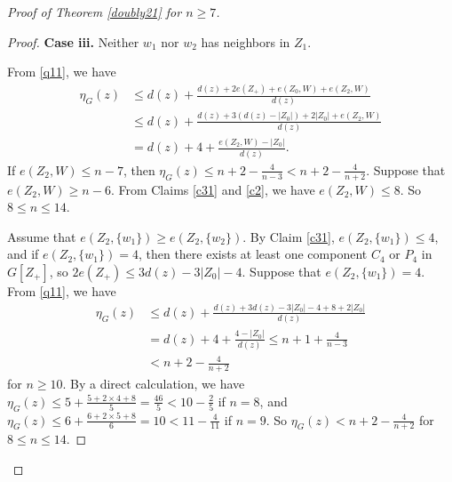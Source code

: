 \documentclass[12pt]{article}
\begin{document}
\begin{proof}[Proof of Theorem \ref{doubly21} for $n\ge 7$]
\begin{proof}
\noindent
{\bf Case iii.} Neither $w_1$ nor $w_2$  has neighbors in  $Z_1$.


From \eqref{q11}, we have
\begin{align*}
\eta_G(z)&\le  d(z)+\frac{d(z)+2e(Z_+)+e(Z_0,W)+e(Z_2,W)}{d(z)}\\
&\le d(z)+\frac{d(z)+3(d(z)-|Z_0|)+2|Z_0|+e(Z_2,W)}{d(z)}\\
&=d(z)+4+\frac{e(Z_2,W)-|Z_0|}{d(z)}.
\end{align*}
If $e(Z_2,W)\le n-7$, then $\eta_G(z)\le n+2-\frac{4}{n-3}<n+2-\frac{4}{n+2}$.
Suppose that $e(Z_2,W)\ge n-6$.
From Claims \ref{c31} and \ref{c2}, we have $e(Z_2,W)\le 8$.
So $8\le n\le 14$.

Assume that $e(Z_2,\{w_1\})\ge e(Z_2,\{w_2\})$. By Claim \ref{c31}, $e(Z_2,\{w_1\})\le 4$, and
if $e(Z_2,\{w_1\})=4$, then  there exists at least one component  $C_4$ or $P_4$ in $G[Z_+]$, so $2e(Z_+)\le 3d(z)-3|Z_0|-4$.
Suppose that $e(Z_2,\{w_1\})=4$.
From \eqref{q11}, we have
\begin{align*}
\eta_G(z)&\le  d(z)+\frac{d(z)+3d(z)-3|Z_0|-4+8+2|Z_0|}{d(z)}\\
&=d(z)+4+\frac{4-|Z_0|}{d(z)}\le n+1+\frac{4}{n-3}\\
&<n+2-\frac{4}{n+2}
\end{align*}
for $n\ge 10$.
By a direct calculation, we have  $\eta_G(z)\le 5+\frac{5+2\times 4+8}{5}=\frac{46}{5}<10-\frac{2}{5}$ if $n=8$, and
$\eta_G(z)\le 6+\frac{6+2\times 5+8}{6}=10<11-\frac{4}{11}$ if $n=9$.
So $\eta_G(z)<n+2-\frac{4}{n+2}$ for $8\le n\le 14$.




\end{proof}
\end{proof}
\end{document}
